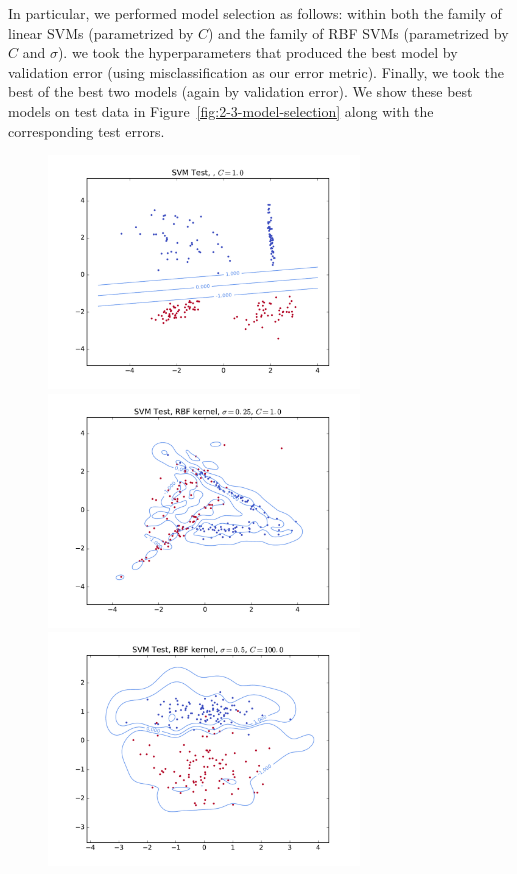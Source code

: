 \documentclass{article}
\begin{document}
\begin{multicols}{2}
In particular, we performed model selection as follows:
within both the family of linear SVMs (parametrized by $C$)
and the family of RBF SVMs (parametrized by $C$ and $\sigma$).
we took the hyperparameters that produced the best model by validation error
(using misclassification as our error metric).
Finally, we took the best of the best two models (again by validation error).
We show these best models on test data in Figure~\ref{fig:2-3-model-selection}
along with the corresponding test errors.

\begin{figure}[t]
   \centering
   \includegraphics[width=3.25in]{img/p2-3-d1-c001/test.pdf}
   \includegraphics[width=3.25in]{img/p2-3-d2-c1-rbf025/test.pdf}
   \includegraphics[width=3.25in]{img/p2-3-d3-c100-rbf025/test.pdf}

\end{figure}
\end{multicols}
\end{document}
